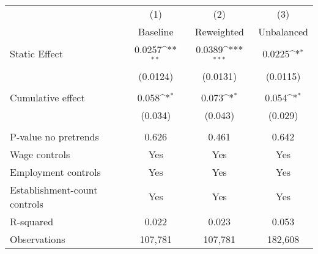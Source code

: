 {
\def\sym#1{\ifmmode^{#1}\else\(^{#1}\)\fi}
\begin{tabular}{l*{3}{c}}
\hline\hline
          &\multicolumn{1}{c}{(1)}&\multicolumn{1}{c}{(2)}&\multicolumn{1}{c}{(3)}\\
          &\multicolumn{1}{c}{Baseline}&\multicolumn{1}{c}{Reweighted}&\multicolumn{1}{c}{Unbalanced}\\
\hline
Static Effect&   0.0257\sym{**} &   0.0389\sym{***}&   0.0225\sym{*}  \\
          & (0.0124)         & (0.0131)         & (0.0115)         \\
\hline
\vspace{-1mm}&                  &                  &                  \\
Cumulative effect&0.058\sym{*}         &0.073\sym{*}         &0.054\sym{*}         \\
          &  (0.034)         &  (0.043)         &  (0.029)         \\
\hline    &                  &                  &                  \\
P-value no pretrends&    0.626         &    0.461         &    0.642         \\
Wage controls&      Yes         &      Yes         &      Yes         \\
Employment controls&      Yes         &      Yes         &      Yes         \\
Establishment-count controls&      Yes         &      Yes         &      Yes         \\
R-squared &    0.022         &    0.023         &    0.053         \\
Observations&  107,781         &  107,781         &  182,608         \\
\hline\hline
\end{tabular}
}
